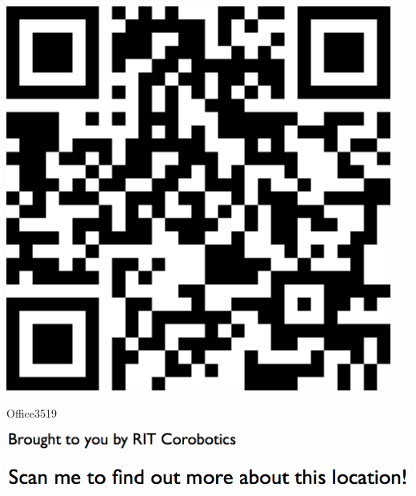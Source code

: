 \documentclass[letterpaper]{article}
\begin{document}
 \begingroup 
 \centerline{\includegraphics[scale=1,width=5in,height=5in]{Office3519.png}} 
 \endgroup 
 \vspace*{\fill} 

 \hfill{\small Office3519} 

  \vspace{0.7in} 
 
 \centerline{\includegraphics[scale=1,width=3in]{text-bottom.png}} 
 
 \pagebreak 
{} 
 \vspace*{\fill} 
 
  \centerline{\includegraphics[scale=1,width=6in]{text-top.png}} 
 
 \vspace{0.5in} 
 
\end{document}
